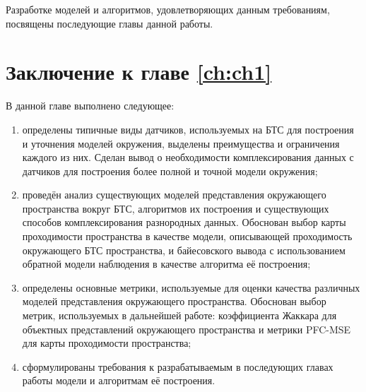 Разработке моделей и алгоритмов, удовлетворяющих данным требованиям, посвящены последующие главы данной работы.

\section{Заключение к главе \ref{ch:ch1}}\label{sec:ch1/conclusion}

В данной главе выполнено следующее:

\begin{enumerate}
	\item определены типичные виды датчиков, используемых на БТС для построения и уточнения моделей окружения, выделены преимущества и ограничения каждого из них. Сделан вывод о необходимости комплексирования данных с датчиков для построения более полной и точной модели окружения;
	\item проведён анализ существующих моделей представления окружающего пространства вокруг БТС, алгоритмов их построения и существующих способов комплексирования разнородных данных. Обоснован выбор карты проходимости пространства в качестве модели, описывающей проходимость окружающего БТС пространства, и байесовского вывода с использованием обратной модели наблюдения в качестве алгоритма её построения;
	\item определены основные метрики, используемые для оценки качества различных моделей представления окружающего пространства. Обоснован выбор метрик, используемых в дальнейшей работе: коэффициента Жаккара для объектных представлений окружающего пространства и метрики PFC-MSE для карты проходимости пространства;
	\item сформулированы требования к разрабатываемым в последующих главах работы модели и алгоритмам её построения.
\end{enumerate}

